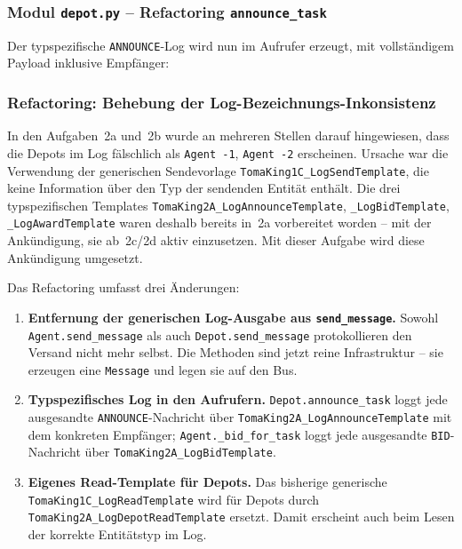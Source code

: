 
\subsubsection{Modul \texttt{depot.py} – Refactoring \texttt{announce\_task}}

Der typspezifische \texttt{ANNOUNCE}-Log wird nun im Aufrufer erzeugt, mit vollständigem Payload inklusive Empfänger:




\subsubsection{Refactoring: Behebung der Log-Bezeichnungs-Inkonsistenz}
\label{sssec:logging_refactoring_2c}

In den Aufgaben~2a und~2b wurde an mehreren Stellen darauf hingewiesen, dass die Depots im Log fälschlich als \texttt{Agent -1}, \texttt{Agent -2} erscheinen. Ursache war die Verwendung der generischen Sendevorlage \texttt{TomaKing1C\_LogSendTemplate}, die keine Information über den Typ der sendenden Entität enthält. Die drei typspezifischen Templates \texttt{TomaKing2A\_LogAnnounceTemplate}, \texttt{\_LogBidTemplate}, \texttt{\_LogAwardTemplate} waren deshalb bereits in~2a vorbereitet worden -- mit der Ankündigung, sie ab~2c/2d aktiv einzusetzen. Mit dieser Aufgabe wird diese Ankündigung umgesetzt.

Das Refactoring umfasst drei Änderungen:

\begin{enumerate}
    \item \textbf{Entfernung der generischen Log-Ausgabe aus \texttt{send\_message}.} Sowohl \texttt{Agent.send\_message} als auch \texttt{Depot.send\_message} protokollieren den Versand nicht mehr selbst. Die Methoden sind jetzt reine Infrastruktur -- sie erzeugen eine \texttt{Message} und legen sie auf den Bus.
    \item \textbf{Typspezifisches Log in den Aufrufern.} \texttt{Depot.announce\_task} loggt jede ausgesandte \texttt{ANNOUNCE}-Nachricht über \texttt{TomaKing2A\_LogAnnounceTemplate} mit dem konkreten Empfänger; \texttt{Agent.\_bid\_for\_task} loggt jede ausgesandte \texttt{BID}-Nachricht über \texttt{TomaKing2A\_LogBidTemplate}.
    \item \textbf{Eigenes Read-Template für Depots.} Das bisherige generische \\ \texttt{TomaKing1C\_LogReadTemplate} wird für Depots durch \\ \texttt{TomaKing2A\_LogDepotReadTemplate} ersetzt. Damit erscheint auch beim Lesen der korrekte Entitätstyp im Log.
\end{enumerate}

